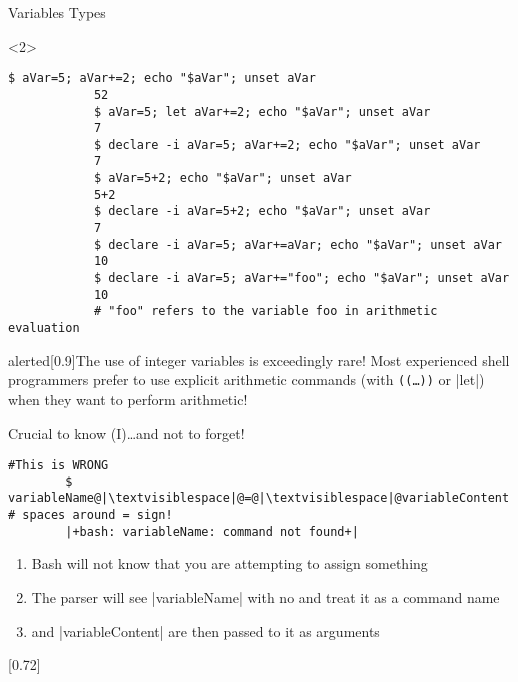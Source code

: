 \begin{frame}[fragile]{Variables Types}
    \begin{onlyenv}<2>
        \begin{lstlisting}[style=MyBash, style=oddnumbers, belowskip=-5mm]
            $ aVar=5; aVar+=2; echo "$aVar"; unset aVar
            52
            $ aVar=5; let aVar+=2; echo "$aVar"; unset aVar
            7
            $ declare -i aVar=5; aVar+=2; echo "$aVar"; unset aVar
            7
            $ aVar=5+2; echo "$aVar"; unset aVar
            5+2
            $ declare -i aVar=5+2; echo "$aVar"; unset aVar
            7
            $ declare -i aVar=5; aVar+=aVar; echo "$aVar"; unset aVar
            10
            $ declare -i aVar=5; aVar+="foo"; echo "$aVar"; unset aVar
            10
            # "foo" refers to the variable foo in arithmetic evaluation
        \end{lstlisting}
        \begin{varblock}{alerted}[0.9\textwidth]{The use of integer variables is exceedingly rare!}
            Most experienced shell programmers prefer to use explicit arithmetic commands (with \texttt{((\ldots))} or \bash|let|) when they want to perform arithmetic!
        \end{varblock}
    \end{onlyenv}
\end{frame}
\begin{frame}[fragile]{Crucial to know (I)}{\ldots{}and not to forget!}
    \begin{lstlisting}[style=MyBash, numbers=none]
        #This is WRONG
        $ variableName@|\textvisiblespace|@=@|\textvisiblespace|@variableContent   # spaces around = sign!
        |+bash: variableName: command not found+|
    \end{lstlisting}
    \bigskip
    \begin{enumerate}
        \item Bash will not know that you are attempting to assign something
        \item The parser will see \bash|variableName| with no \bash{=} and treat it as a command name
        \item \bash{=} and \bash|variableContent| are then passed to it as arguments
    \end{enumerate}
    \bigskip
    \begin{varblock}{}[0.72\textwidth]{}
        \Large{}
    \end{varblock}
    
\end{frame}

